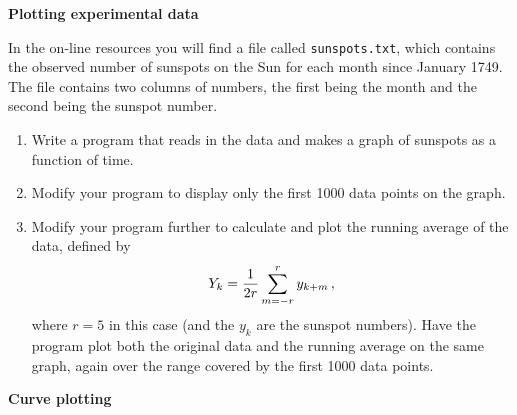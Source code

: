 \documentclass[12pt]{article}
\begin{document}
\par
\bigskip
{}\par
\noindent\hrulefill


\begin{exercises}


\exercise \textbf{Plotting experimental data}

\exskip In the on-line resources you will find a file called
\verb|sunspots.txt|, which contains the observed number of sunspots on the
Sun for each month since January 1749.  The file contains two columns of
numbers, the first being the month and the second being the sunspot number.
\begin{enumerate}\setlength{\itemsep}{0pt}
\item Write a program that reads in the data and makes a graph of sunspots
  as a function of time.
\item Modify your program to display only the first 1000 data points on the
  graph.
\item Modify your program further to calculate and plot the running average
  of the data, defined by
\begin{displaymath}
Y_k = {1\over2r} \sum_{m=-r}^r y_{k+m}\,,
\end{displaymath}
where $r=5$ in this case (and the $y_k$ are the sunspot numbers).  Have the
program plot both the original data and the running average on the same
graph, again over the range covered by the first 1000 data points.
\end{enumerate}



\exercise\textbf{Curve plotting}


\end{exercises}
\end{document}
